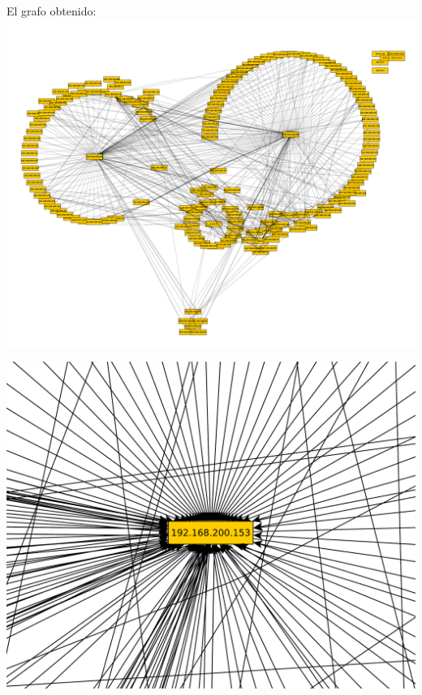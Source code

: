 \indent El grafo obtenido:\\

\includegraphics[scale=0.5,clip=true,trim=20 0 0 0]{graphics/laburomediano.pdf}

\includegraphics[scale=0.3,clip=true,trim=20 0 0 0]{graphics/laburomediano153.pdf}

